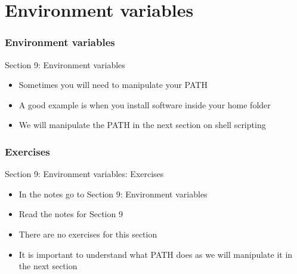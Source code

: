 \part{Environment variables}
\begin{frame}
\partpage
\end{frame}

\section{Environment variables}
\begin{frame}{Section 9: Environment variables}
\begin{itemize}
\item Sometimes you will need to manipulate your PATH
\item A good example is when you install software inside your home folder
\item We will manipulate the PATH in the next section on shell scripting
\end{itemize}
\end{frame}


\section{Exercises}
\begin{frame}{Section 9: Environment variables: Exercises}
\begin{itemize}
\item In the notes go to {Section 9: Environment variables}
\item Read the notes for Section 9
\item There are no exercises for this section
\item It is important to understand what PATH does as we will manipulate it in the next section
\end{itemize}
\end{frame}


